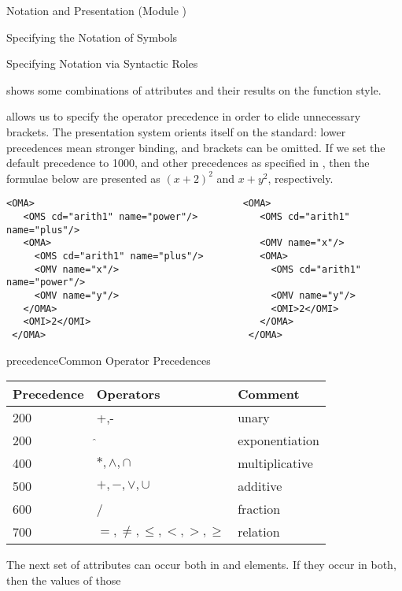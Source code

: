 \begin{tchapter}[id=pres,short=Notation and Presentation]{Notation and Presentation (Module {})}
\begin{tsection}[id=presentation,short=Notation of Symbols]{Specifying the Notation of Symbols}
\begin{tsubsection}[id=pres-declarative]{Specifying Notation via Syntactic Roles}
\begin{description}
  {} shows some combinations of attributes and their
  results on the function style.
\item[{\attribute{precedence}{presentation}}] allows us to specify the operator precedence
  in order to elide unnecessary brackets. The {\omdoc} presentation system orients itself
  on the {} standard: lower precedences mean stronger binding, and brackets
  can be omitted. If we set the default precedence to 1000, and other precedences as
  specified in {}, then the formulae below are presented as $(x+2)^2$
  and $x+y^2$, respectively.
  \begin{center}
\begin{lstlisting}[numbers=none,index={OMA,OMS,OMV}]
 <OMA>                                     <OMA>
   <OMS cd="arith1" name="power"/>           <OMS cd="arith1" name="plus"/>   
   <OMA>                                     <OMV name="x"/>
     <OMS cd="arith1" name="plus"/>          <OMA>
     <OMV name="x"/>                           <OMS cd="arith1" name="power"/>
     <OMV name="y"/>                           <OMV name="y"/>
   </OMA>                                      <OMI>2</OMI>
   <OMI>2</OMI>                              </OMA>
 </OMA>                                    </OMA>
\end{lstlisting}
\end{center}
\begin{myfig}{precedence}{Common Operator Precedences}
  \begin{tabular}{|l|l|l|}\hline
    Precedence & Operators                  & Comment\\\hline\hline
    200    & +,-                        & unary \\\hline
    200    & $\hat{}$                   & exponentiation \\\hline
    400    & $*,\land,\cap$             & multiplicative \\\hline
    500    & $+,-,\lor,\cup$            & additive\\\hline
    600    & /                          & fraction \\\hline
    700    & $=, \ne, \leq, <, >, \geq$ & relation\\\hline
  \end{tabular}
\end{myfig}
\end{description}
The next set of attributes can occur both in {} and
{} elements. If they occur in both, then the values of those

\end{tsubsection}
\end{tsection}
\end{tchapter}
